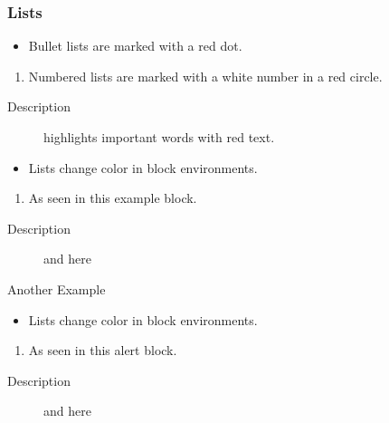 \documentclass[9pt]{beamer}
\begin{document}
\begin{frame}
  \frametitle{Lists}

  \begin{itemize}
    \item Bullet lists are marked with a red dot.
  \end{itemize}

  \begin{enumerate}
    \item Numbered lists are marked with a white number in a red circle.
  \end{enumerate}

  \begin{description}
    \item[Description] highlights important words with red text.
  \end{description}

  \begin{example}

    \begin{itemize}
      \item Lists change color in block environments.
    \end{itemize}

    \begin{enumerate}
      \item As seen in this example block.
    \end{enumerate}

    \begin{description}
      \item[Description] and here
    \end{description}

  \end{example}

  \begin{alertblock}{Another Example}

    \begin{itemize}
      \item Lists change color in block environments.
    \end{itemize}

    \begin{enumerate}
      \item As seen in this alert block.
    \end{enumerate}

    \begin{description}
      \item[Description] and here
    \end{description}

  \end{alertblock}

\end{frame}
\end{document}
